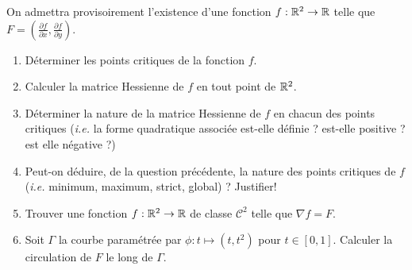 \documentclass{article}
\begin{document}
On admettra provisoirement l'existence d'une fonction $f:\mathbb{R}^2 \to \mathbb{R}$ telle que $F = (\frac{\partial f}{\partial x} , \frac{\partial f}{\partial y})$.
\begin{enumerate}
	\item Déterminer les points critiques de la fonction $f$.
	\item Calculer la matrice Hessienne de $f$ en tout point de $\mathbb{R}^2$. 
	\item Déterminer la nature de la matrice Hessienne de $f$ en chacun des points critiques  (\textit{i.e.} la forme quadratique associée est-elle définie ? est-elle positive ? est elle négative ?)
	\item Peut-on déduire, de la question précédente, la nature des points critiques de $f$ (\textit{i.e.} minimum, maximum, strict, global) ? Justifier!
	\item Trouver une fonction $f:\mathbb{R}^2 \to \mathbb{R}$ de classe $\mathcal C^2$ telle que $\nabla f = F$.
	\item Soit $\Gamma$ la courbe paramétrée par $\phi : t \mapsto (t,t^2)$ pour $t \in [0,1]$. Calculer la circulation de $F$  le long de $\Gamma$.
\end{enumerate}
\end{document}
